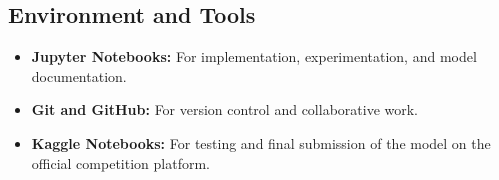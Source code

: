 \documentclass{article}
\begin{document}
\subsection*{Environment and Tools}
\begin{itemize}
  \item \textbf{Jupyter Notebooks:} For implementation, experimentation, and model documentation.
  \item \textbf{Git and GitHub:} For version control and collaborative work.
  \item \textbf{Kaggle Notebooks:} For testing and final submission of the model on the official competition platform.
\end{itemize}
\end{document}
